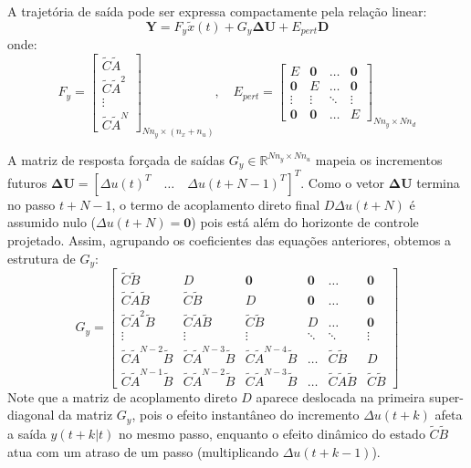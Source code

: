 \documentclass[12pt]{article}
\begin{document}
A trajetória de saída pode ser expressa compactamente pela relação linear:
\begin{equation}
\label{eq:predicao_saida_matricial}
\bm{Y} = F_y \tilde{x}(t) + G_y \bm{\Delta U} + E_{pert} \bm{D}
\end{equation}
onde:
\begin{equation}
F_y = \begin{bmatrix} \tilde{C}\tilde{A} \\ \tilde{C}\tilde{A}^2 \\ \vdots \\ \tilde{C}\tilde{A}^N \end{bmatrix}_{N n_y \times (n_x+n_u)}, \quad
E_{pert} = \begin{bmatrix} 
E & \bm{0} & \dots & \bm{0} \\
\bm{0} & E & \dots & \bm{0} \\
\vdots & \vdots & \ddots & \vdots \\
\bm{0} & \bm{0} & \dots & E 
\end{bmatrix}_{N n_y \times N n_d}
\end{equation}

A matriz de resposta forçada de saídas $G_y \in \mathbb{R}^{N n_y \times N n_u}$ mapeia os incrementos futuros $\bm{\Delta U} = [\Delta u(t)^T \quad \dots \quad \Delta u(t+N-1)^T]^T$. Como o vetor $\bm{\Delta U}$ termina no passo $t+N-1$, o termo de acoplamento direto final $D\Delta u(t+N)$ é assumido nulo ($\Delta u(t+N) = \bm{0}$) pois está além do horizonte de controle projetado. Assim, agrupando os coeficientes das equações anteriores, obtemos a estrutura de $G_y$:
\begin{equation}
\label{eq:matriz_Gy_correta}
G_y = \begin{bmatrix}
\tilde{C}\tilde{B} & D & \bm{0} & \bm{0} & \dots & \bm{0} \\
\tilde{C}\tilde{A}\tilde{B} & \tilde{C}\tilde{B} & D & \bm{0} & \dots & \bm{0} \\
\tilde{C}\tilde{A}^2\tilde{B} & \tilde{C}\tilde{A}\tilde{B} & \tilde{C}\tilde{B} & D & \dots & \bm{0} \\
\vdots & \vdots & \vdots & \ddots & \ddots & \vdots \\
\tilde{C}\tilde{A}^{N-2}\tilde{B} & \tilde{C}\tilde{A}^{N-3}\tilde{B} & \tilde{C}\tilde{A}^{N-4}\tilde{B} & \dots & \tilde{C}\tilde{B} & D \\
\tilde{C}\tilde{A}^{N-1}\tilde{B} & \tilde{C}\tilde{A}^{N-2}\tilde{B} & \tilde{C}\tilde{A}^{N-3}\tilde{B} & \dots & \tilde{C}\tilde{A}\tilde{B} & \tilde{C}\tilde{B}
\end{bmatrix}
\end{equation}
Note que a matriz de acoplamento direto $D$ aparece deslocada na primeira super-diagonal da matriz $G_y$, pois o efeito instantâneo do incremento $\Delta u(t+k)$ afeta a saída $y(t+k|t)$ no mesmo passo, enquanto o efeito dinâmico do estado $\tilde{C}\tilde{B}$ atua com um atraso de um passo (multiplicando $\Delta u(t+k-1)$).
\end{document}
